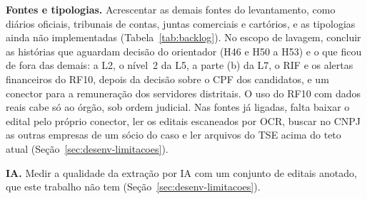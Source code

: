 \textbf{Fontes e tipologias.} Acrescentar as demais fontes do levantamento,
como diários oficiais, tribunais de contas, juntas comerciais e cartórios,
e as tipologias ainda não implementadas (Tabela~\ref{tab:backlog}). No
escopo de lavagem, concluir as histórias que aguardam decisão do
orientador (H46 e H50 a H53) e o que ficou de fora das demais: a L2, o
nível~2 da L5, a parte (b) da L7, o RIF e os alertas financeiros do RF10, depois da decisão sobre o CPF dos candidatos,
e um conector para a remuneração dos servidores distritais. O uso do RF10 com dados reais cabe só ao órgão, sob ordem
judicial. Nas
fontes já ligadas, falta baixar o edital pelo próprio conector, ler os
editais escaneados por OCR, buscar no CNPJ as outras empresas de um sócio do
caso e ler arquivos do TSE acima do teto atual
(Seção~\ref{sec:desenv-limitacoes}).

\textbf{IA.} Medir a qualidade da extração por IA com um conjunto de editais
anotado, que este trabalho não tem (Seção~\ref{sec:desenv-limitacoes}).

\endgroup
